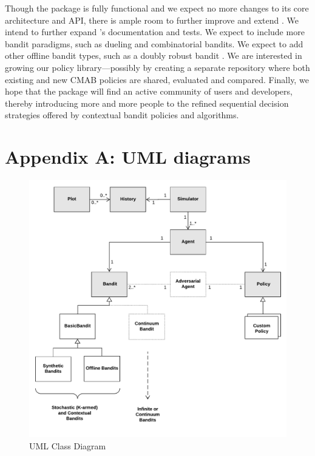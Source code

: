 \documentclass{jss}
\begin{document}
Though the package is fully functional and we expect no more changes to its core architecture and API, there is ample room to further improve and extend . We intend to further expand 's documentation and tests. We expect to include more bandit paradigms, such as dueling and combinatorial bandits. We expect to add other offline bandit types, such as a doubly robust bandit \citep{Dudik2011}. We are interested in growing our policy library---possibly by creating a separate repository where both existing and new CMAB policies are shared, evaluated and compared. Finally, we hope that the package will find an active community of users and developers, thereby introducing more and more people to the refined sequential decision strategies offered by contextual bandit policies and algorithms.

%


\newpage

\section{Appendix A: UML diagrams} \label{uml}

\begin{figure}[H]
  \centering
    \includegraphics[width=.99\textwidth]{fig/contextual_class}

      \caption{ UML Class Diagram}
          \label{fig:contextual_class}
\end{figure}
\end{document}
